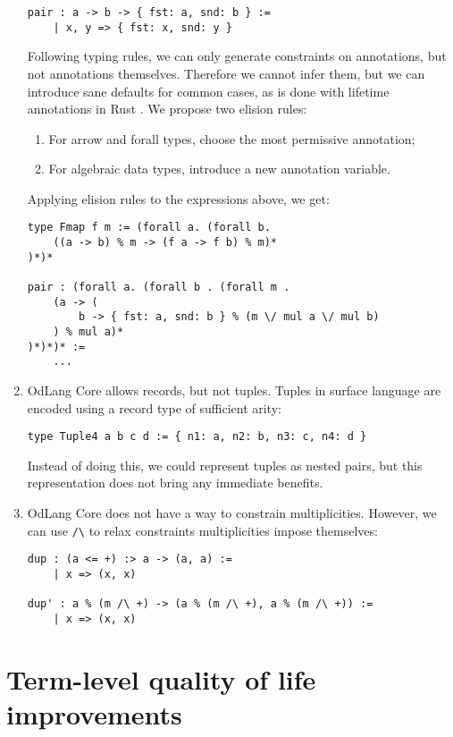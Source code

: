 \documentclass[a4paper,14pt]{extreport}
\begin{document}
\begin{enumerate}
\begin{verbatim}
pair : a -> b -> { fst: a, snd: b } :=
    | x, y => { fst: x, snd: y }
\end{verbatim}
        Following typing rules, we can only generate constraints on annotations,
        but not annotations themselves. Therefore we cannot infer them, but we
        can introduce sane defaults for common cases, as is done with lifetime
        annotations in Rust \cite{elision}. We propose two elision rules:
        \begin{enumerate}
            \item For arrow and forall types, choose the most permissive
                annotation;
            \item For algebraic data types, introduce a new annotation variable.
        \end{enumerate}
        Applying elision rules to the expressions above, we get:
\begin{verbatim}
type Fmap f m := (forall a. (forall b.
    ((a -> b) % m -> (f a -> f b) % m)*
)*)*

pair : (forall a. (forall b . (forall m .
    (a -> (
        b -> { fst: a, snd: b } % (m \/ mul a \/ mul b)
    ) % mul a)*
)*)*)* :=
    ...
\end{verbatim}
    \item OdLang Core allows records, but not tuples. Tuples in surface language
        are encoded using a record type of sufficient arity:
\begin{verbatim}
type Tuple4 a b c d := { n1: a, n2: b, n3: c, n4: d }
\end{verbatim}
        Instead of doing this, we could represent tuples as nested pairs, but
        this representation does not bring any immediate benefits.
    \item OdLang Core does not have a way to constrain multiplicities. However,
        we can use \verb|/\| to relax constraints multiplicities impose
        themselves:
\begin{verbatim}
dup : (a <= +) :> a -> (a, a) :=
    | x => (x, x)

dup' : a % (m /\ +) -> (a % (m /\ +), a % (m /\ +)) :=
    | x => (x, x)
\end{verbatim}
\end{enumerate}

\section{Term-level quality of life improvements}
\end{document}
